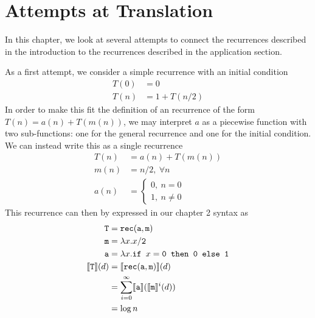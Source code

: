 \chapter{Attempts at Translation}
In this chapter, we look at several attempts to connect the recurrences described in the introduction to the 
recurrences described in the application section.

As a first attempt, we consider a simple recurrence with an initial condition
\begin{align*}
T(0) &= 0 \\
T(n) &= 1 + T(n/2) 
\end{align*}
In order to make this fit the definition of an recurrence of the form $T(n) = a(n) + T(m(n))$, we may interpret $a$ as a 
piecewise function with two sub-functions: one for the general recurrence and one for the initial condition.
We can instead write this as a single recurrence
\begin{align*}
T(n) &= a(n) + T(m(n)) \\
m(n) &= n/2, \ \forall n \\ 
a(n) &=
\begin{cases} 
0, \ n = 0 \\
1, \ n \neq 0
\end{cases}
\end{align*} 
This recurrence can then by expressed in our chapter 2 syntax as 
\begin{align*}
\texttt{T} &= \texttt{rec}(\texttt{a},\texttt{m}) \\
\texttt{m} &= \lambda x.x/\texttt{2} \\
\texttt{a} &= \lambda x.\texttt{if } x=\texttt{0} \texttt{ then } \texttt{0} \texttt{ else } \texttt{1} \\
\llbracket \texttt{T} \rrbracket(d) &= \llbracket \texttt{rec}(\texttt{a},\texttt{m}) \rrbracket(d) \\
&= \sum_{i=0}^{\infty}\llbracket \texttt{a} \rrbracket(\llbracket \texttt{m}\rrbracket^i(d)) \\
&= \log n
\end{align*}

